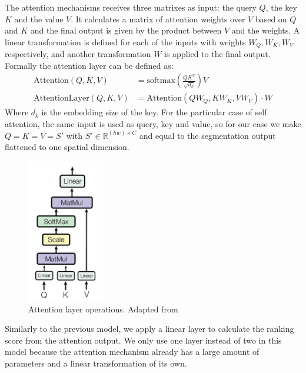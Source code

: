 The attention mechanisms receives three matrixes as input: the query $Q$, the key $K$ and the value
$V$. It calculates a matrix of attention weights over $V$ based on $Q$ and $K$ and the final output
is given by the product between $V$ and the weights. A linear transformation is defined
for each of the inputs with weights $W_Q, W_K, W_V$ respectively, and another transformation $W$
is applied to the final output. Formally the attention layer can be defined as:
\begin{align}
	\label{eq:attention}
	\text{Attention}(Q,K,V) &= \text{softmax}(\frac{QK^T}{\sqrt{d_k}})V \\
	\label{eq:attention_layer}
	\text{AttentionLayer}(Q,K,V) &=  \text{Attention}(QW_Q,KW_K,VW_V)\cdot W
\end{align}
Where $d_k$ is the embedding size of the key. For the particular case of self attention,
the same input is used as query, key and value, so for our case we make $Q=K=V=S'$ with
$S' \in \mathbb{R}^{(hw) \times C}$ and equal to the segmentation output flattened to one
spatial dimension.

\begin{figure}[ht]
	\begin{center}
	\includegraphics[width=0.3\textwidth]{./figures/attention.png}
	\caption[Attention Mechanism]{Attention layer operations. Adapted from }
	\label{fig:segrank_1}
	\end{center}
\end{figure}

Similarly to the previous model, we apply a linear layer to calculate the ranking score from the attention output.
We only use one layer instead of two in this model because the attention mechanism already has a large amount of parameters and a
linear transformation of its own.

